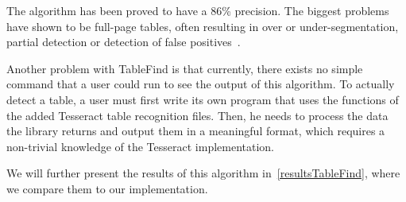 The algorithm has been proved to have a 86\% precision. The biggest problems have shown to be full-page tables, often resulting in over or under-segmentation, partial detection or detection of false positives~\citep{tableDetHeterogeneous}.

Another problem with TableFind is that currently, there exists no simple command that a user could run to see the output of this algorithm. To actually detect a table, a user must first write its own program that uses the functions of the added Tesseract table recognition files. Then, he needs to process the data the library returns and output them in a meaningful format, which requires a non-trivial knowledge of the Tesseract implementation.

We will further present the results of this algorithm in~\cref{resultsTableFind}, where we compare them to our implementation.
   
